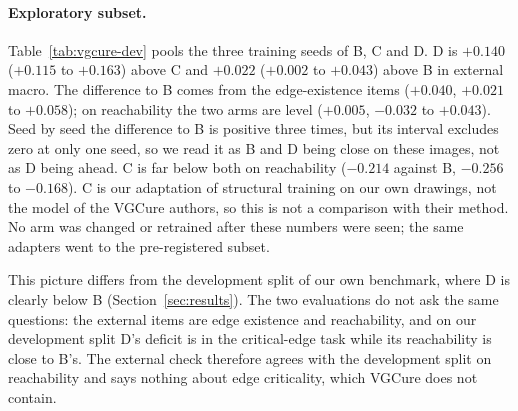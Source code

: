 \paragraph{Exploratory subset.}
Table~\ref{tab:vgcure-dev} pools the three training seeds of B, C and D. D is
$+0.140$ ($+0.115$ to $+0.163$) above C and $+0.022$ ($+0.002$ to $+0.043$) above B in external
macro. The difference to B comes from the edge-existence items ($+0.040$, $+0.021$ to
$+0.058$); on reachability the two arms are level ($+0.005$, $-0.032$ to $+0.043$). Seed by
seed the difference to B is positive three times, but its interval excludes zero at only one
seed, so we read it as B and D being close on these images, not as D being ahead. C is far
below both on reachability ($-0.214$ against B, $-0.256$ to $-0.168$). C is our adaptation of
structural training on our own drawings, not the model of the VGCure authors, so this is not a
comparison with their method. No arm was changed or retrained after these numbers were seen;
the same adapters went to the pre-registered subset.

This picture differs from the development split of our own benchmark, where D is clearly below
B (Section~\ref{sec:results}). The two evaluations do not ask the same questions: the external
items are edge existence and reachability, and on our development split D's deficit is in the
critical-edge task while its reachability is close to B's. The external check therefore agrees
with the development split on reachability and says nothing about edge criticality, which
VGCure does not contain.

\begin{table}[t]
\centering\small
\resizebox{\linewidth}{!}{}
\caption{Exploratory VGCure subset ($400$ graphs, $1{,}200$ items), adapted prompts, images
scaled to $512\times512$; pooled over three training seeds. Brackets are 95\% paired bootstrap
intervals over graphs. These numbers were looked at during the project and are not the
pre-registered external result.}
\label{tab:vgcure-dev}
\end{table}

